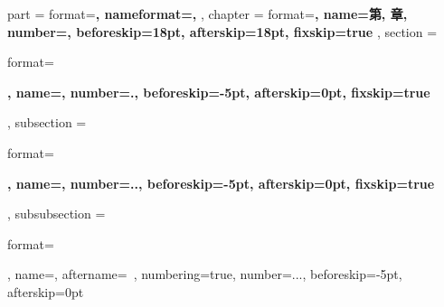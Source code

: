 {{        \renewcommand{\contentsname}    {目录}
        \renewcommand{\listfigurename}  {图目录}
        \renewcommand{\listtablename}   {表目录}
    }
    {
        \ctexset
        {
            part =
            {
                format=\centering{}\bfseries,
                nameformat=\centering\heiti\fontsize{48}{48}\bfseries,
            },
            chapter =
            {
                format=\centering{}\bfseries,
                name={第, 章},
                number=,
                beforeskip=18pt,
                afterskip=18pt,
                fixskip=true
            },
            section =
            {
                format=\raggedright{}\bfseries,
                name={},
                number=.,
                beforeskip=-5pt,
                afterskip=0pt,
                fixskip=true
            },
            subsection =
            {
                format=\raggedright{}\bfseries,
                name={},
                number=..,
                beforeskip=-5pt,
                afterskip=0pt,
                fixskip=true
            },
            subsubsection =
            {
                format=\raggedright{},
                name={},
                aftername=~,
                numbering=true,
                number=...,
                beforeskip=-5pt,
                afterskip=0pt
            }
        }

        \renewcommand{\chapternonum}[1]
        {
            \phantomsection
            \addcontentsline{toc}{chapter}{#1}
            \markboth{#1}{#1}
            \chapter*{\bfseries \heiti #1}
        }

        \renewcommand{\contentsname}    {目录}
        \renewcommand{\listfigurename}  {图目录}
        \renewcommand{\listtablename}   {表目录}
    }
}
{}
